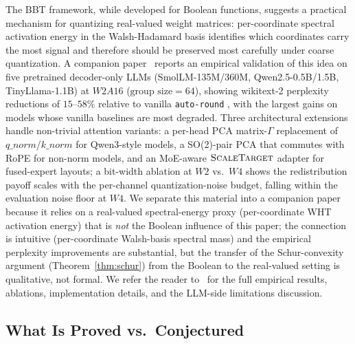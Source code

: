 \documentclass[11pt]{article}
\begin{document}
The BBT framework, while developed for Boolean functions, suggests a practical mechanism for quantizing real-valued weight matrices: per-coordinate spectral activation energy in the Walsh-Hadamard basis identifies which coordinates carry the most signal and therefore should be preserved most carefully under coarse quantization. A companion paper~\cite{bbtQuantCompanion} reports an empirical validation of this idea on five pretrained decoder-only LLMs (SmolLM-135M/360M, Qwen2.5-0.5B/1.5B, TinyLlama-1.1B) at $W2A16$ ($\text{group size}=64$), showing wikitext-2 perplexity reductions of $15$--$58\%$ relative to vanilla \texttt{auto-round} \cite{cheng2023autoround}, with the largest gains on models whose vanilla baselines are most degraded. Three architectural extensions handle non-trivial attention variants: a per-head PCA matrix-$\Gamma$ replacement of $q\_norm$/$k\_norm$ for Qwen3-style models, a SO(2)-pair PCA that commutes with RoPE for non-norm models, and an MoE-aware $\textsc{ScaleTarget}$ adapter for fused-expert layouts; a bit-width ablation at $W2$ vs.\ $W4$ shows the redistribution payoff scales with the per-channel quantization-noise budget, falling within the evaluation noise floor at $W4$. We separate this material into a companion paper because it relies on a real-valued spectral-energy proxy (per-coordinate WHT activation energy) that is \emph{not} the Boolean influence of this paper; the connection is intuitive (per-coordinate Walsh-basis spectral mass) and the empirical perplexity improvements are substantial, but the transfer of the Schur-convexity argument (Theorem~\ref{thm:schur}) from the Boolean to the real-valued setting is qualitative, not formal. We refer the reader to~\cite{bbtQuantCompanion} for the full empirical results, ablations, implementation details, and the LLM-side limitations discussion.


\subsection{What Is Proved vs.\ Conjectured}
\end{document}
